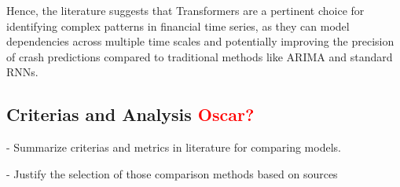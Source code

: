 \documentclass[12pt, letterpaper]{article}
\begin{document}
Hence, the literature suggests that Transformers are a pertinent choice for identifying complex patterns in financial time series, as they can model dependencies across multiple time scales and potentially improving the precision of crash predictions compared to traditional methods like ARIMA and standard RNNs.


\subsection*{Criterias and Analysis \textcolor{red}{Oscar?}}
- Summarize criterias and metrics in literature for comparing models.

- Justify the selection of those comparison methods based on sources

\pagebreak
\printbibliography

\end{document}
